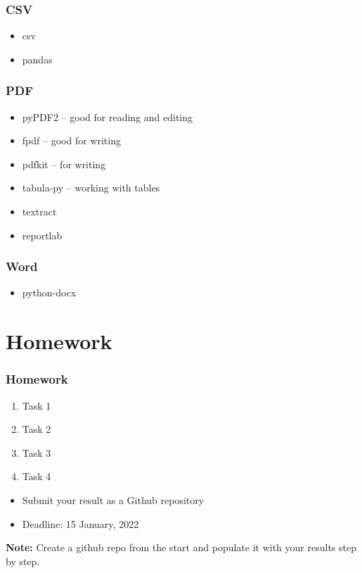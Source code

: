 \documentclass{beamer}
\begin{document}
\begin{frame}
    \frametitle{CSV}
            \begin{itemize}
                \item csv
                \item pandas
            \end{itemize}
\end{frame}

\begin{frame}
    \frametitle{PDF}
            \begin{itemize}
                \item pyPDF2 – good for reading and editing
                \item fpdf – good for writing
                \item pdfkit – for writing
                \item tabula-py – working with tables
                \item textract
                \item reportlab
            \end{itemize}
\end{frame}

\begin{frame}
    \frametitle{Word}
            \begin{itemize}
                \item python-docx                
            \end{itemize}
\end{frame}

\section{Homework} 

\begin{frame}
    \frametitle{Homework}
    \begin{enumerate}
        \item Task 1
        \item Task 2
        \item Task 3
        \item Task 4
    \end{enumerate}

    \vskip 2mm
    \begin{itemize}
        \item Submit your result as a Github repository
        \item Deadline: 15 January, 2022
    \end{itemize}

\vfill
\textbf{Note:} Create a github repo from the start and populate it with your results step by step.
\end{frame}
\end{document}
